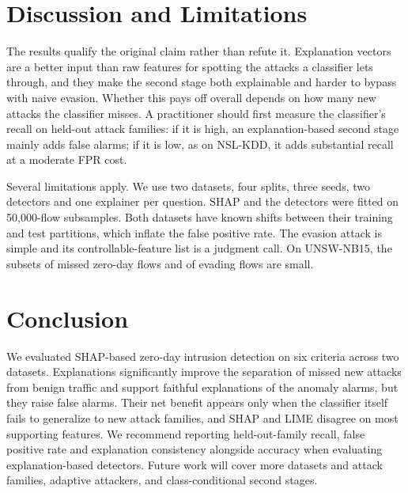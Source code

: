 \documentclass[conference]{IEEEtran}
\begin{document}
\section{Discussion and Limitations}
The results qualify the original claim rather than refute it. Explanation vectors are a better input than raw features for spotting the attacks a classifier lets through, and they make the second stage both explainable and harder to bypass with naive evasion. Whether this pays off overall depends on how many new attacks the classifier misses. A practitioner should first measure the classifier's recall on held-out attack families: if it is high, an explanation-based second stage mainly adds false alarms; if it is low, as on NSL-KDD, it adds substantial recall at a moderate FPR cost.

Several limitations apply. We use two datasets, four splits, three seeds, two detectors and one explainer per question. SHAP and the detectors were fitted on 50,000-flow subsamples. Both datasets have known shifts between their training and test partitions, which inflate the false positive rate. The evasion attack is simple and its controllable-feature list is a judgment call. On UNSW-NB15, the subsets of missed zero-day flows and of evading flows are small.

\section{Conclusion}
We evaluated SHAP-based zero-day intrusion detection on six criteria across two datasets. Explanations significantly improve the separation of missed new attacks from benign traffic and support faithful explanations of the anomaly alarms, but they raise false alarms. Their net benefit appears only when the classifier itself fails to generalize to new attack families, and SHAP and LIME disagree on most supporting features. We recommend reporting held-out-family recall, false positive rate and explanation consistency alongside accuracy when evaluating explanation-based detectors. Future work will cover more datasets and attack families, adaptive attackers, and class-conditional second stages.



\end{document}
